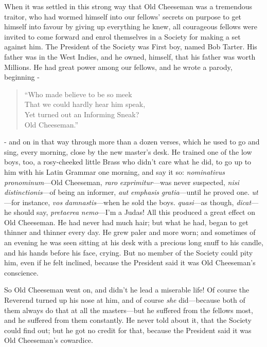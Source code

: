 When it was settled in this strong way that Old Cheeseman was a
tremendous traitor, who had wormed himself into our fellows' secrets
on purpose to get himself into favour by giving up everything he
knew, all courageous fellows were invited to come forward and enrol
themselves in a Society for making a set against him.  The President
of the Society was First boy, named Bob Tarter.  His father was in
the West Indies, and he owned, himself, that his father was worth
Millions.  He had great power among our fellows, and he wrote a
parody, beginning -%

\begin{verse}
  ``Who made believe to be so meek\\
  That we could hardly hear him speak,\\
  Yet turned out an Informing Sneak?\\
  Old Cheeseman.''
\end{verse}

- and on in that way through more than a dozen verses, which he used
to go and sing, every morning, close by the new master's desk.  He
trained one of the low boys, too, a rosy-cheeked little Brass who
didn't care what he did, to go up to him with his Latin Grammar one
morning, and say it so:  \emph{nominativus} \emph{pronominum}---Old Cheeseman, \emph{raro}
\emph{exprimitur}---was never suspected, \emph{nisi} \emph{distinctionis}---of being an
informer, \emph{aut} \emph{emphasis} \emph{gratia}---until he proved one.  \emph{ut}---for
instance, \emph{vos} \emph{damnastis}---when he sold the boys.  \emph{quasi}---as though,
\emph{dicat}---he should say, \emph{pretaerea} \emph{nemo}---I'm a Judas!  All this
produced a great effect on Old Cheeseman.  He had never had much
hair; but what he had, began to get thinner and thinner every day.
He grew paler and more worn; and sometimes of an evening he was seen
sitting at his desk with a precious long snuff to his candle, and
his hands before his face, crying.  But no member of the Society
could pity him, even if he felt inclined, because the President said
it was Old Cheeseman's conscience.

So Old Cheeseman went on, and didn't he lead a miserable life!  Of
course the Reverend turned up his nose at him, and of course \emph{she}
did---because both of them always do that at all the masters---but he
suffered from the fellows most, and he suffered from them
constantly.  He never told about it, that the Society could find
out; but he got no credit for that, because the President said it
was Old Cheeseman's cowardice.

